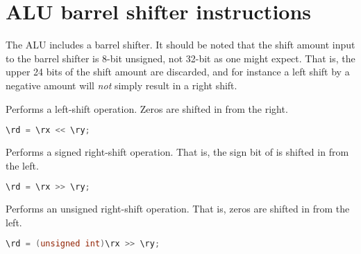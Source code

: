 
\section{ALU barrel shifter instructions}


The \rvex{} ALU includes a barrel shifter. It should be noted that the shift
amount input to the barrel shifter is 8-bit unsigned, not 32-bit as one might
expect. That is, the upper 24 bits of the shift amount are discarded, and for
instance a left shift by a negative amount will \emph{not} simply result in a
right shift.

Performs a left-shift operation. Zeros are shifted in from the right.

\begin{lstlisting}[numbers=none, basicstyle=\ttfamily\footnotesize, language=C++]
\rd = \rx << \ry;
\end{lstlisting}

Performs a signed right-shift operation. That is, the sign bit of \code{\rx} is
shifted in from the left.

\begin{lstlisting}[numbers=none, basicstyle=\ttfamily\footnotesize, language=C++]
\rd = \rx >> \ry;
\end{lstlisting}

Performs an unsigned right-shift operation. That is, zeros are shifted in from
the left.

\begin{lstlisting}[numbers=none, basicstyle=\ttfamily\footnotesize, language=C++]
\rd = (unsigned int)\rx >> \ry;
\end{lstlisting}
